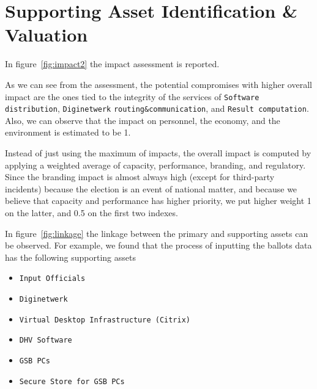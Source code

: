 \section*{Supporting Asset Identification \& Valuation}

In figure~\ref{fig:impact2} the impact assessment is reported.

As we can see from the assessment, the potential compromises with higher overall impact are the ones tied to the integrity of the services of \texttt{Software distribution}, \texttt{Diginetwerk} \texttt{routing\&communication}, and \texttt{Result computation}. Also, we can observe that the impact on personnel, the economy, and the environment is estimated to be 1. 

Instead of just using the maximum of impacts, the overall impact is computed by applying a weighted average of capacity, performance, branding, and regulatory. Since the branding impact is almost always high (except for third-party incidents) because the election is an event of national matter, and because we believe that capacity and performance has higher priority, we put higher weight 1 on the latter, and 0.5 on the first two indexes.

In figure~\ref{fig:linkage} the linkage between the primary and supporting assets can be observed. For example, we found that the process of inputting the ballots data has the following supporting assets

\begin{itemize}
    \item \texttt{Input Officials}
    \item \texttt{Diginetwerk}
    \item \texttt{Virtual Desktop Infrastructure (Citrix)}
    \item \texttt{DHV Software}
    \item \texttt{GSB PCs}
    \item \texttt{Secure Store for GSB PCs}
\end{itemize}

\newpage
